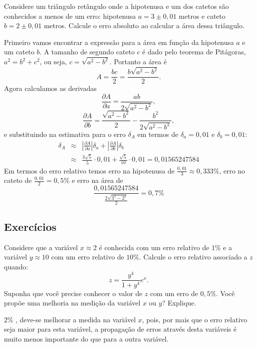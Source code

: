 \begin{ex}
Considere um triângulo retângulo onde a hipotenusa e um dos catetos são conhecidos a menos de um erro: hipotenusa $a=3\pm 0,01$ metros e cateto $b=2\pm 0,01$ metros. Calcule o erro absoluto ao calcular a área dessa triângulo.
\end{ex}
\begin{sol}
Primeiro vamos encontrar a expressão para a área em função da hipotenusa $a$ e um cateto $b$. A tamanho de segundo cateto $c$ é dado pelo teorema de Pitágoras, $a^2=b^2+c^2$, ou seja, $c=\sqrt{a^2-b^2}$. Portanto a área é $$
A=\frac{bc}{2}=\frac{b\sqrt{a^2-b^2}}{2}.
$$
Agora calculamos as derivadas
$$
\frac{\partial A}{\partial a}=\frac{ab}{2\sqrt{a^2-b^2}},
$$
$$
\frac{\partial A}{\partial b}=\frac{\sqrt{a^2-b^2}}{2}-\frac{b^2}{2\sqrt{a^2-b^2}},
$$
e substituindo na estimativa para o erro $\delta_A$ em termos de $\delta_a=0,01$ e $\delta_b=0,01$:
\begin{eqnarray*}
\delta_A&\approx & \left|\frac{\partial A}{\partial a}\right|\delta_a+\left|\frac{\partial A}{\partial b}\right|\delta_b\\
&\approx &\frac{3\sqrt{5}}{5}\cdot 0,01+\frac{\sqrt{5}}{10}\cdot 0,01=0,01565247584
\end{eqnarray*}
Em termos do erro relativo temos erro na hipotenusa de $\frac{0,01}{3}\approx 0,333\%$, erro no cateto de $\frac{0,01}{2}= 0,5\%$ e erro na área de
$$
\frac{0,01565247584}{\frac{2\sqrt{3^2-2^2}}{2}}=0,7\%
$$
\end{sol}

\subsection*{Exercícios}

\begin{exer}Considere que a variável $x\approx 2$ é conhecida com um erro relativo de $1\%$ e a variável $y\approx 10$ com um erro relativo de $10\%$. Calcule o erro relativo associado a $z$ quando:
  \begin{equation*}
    z=\frac{y^4}{1+y^4}e^x.  
  \end{equation*}
Suponha que você precise conhecer o valor de $z$ com um erro de $0,5\%$. Você propõe uma melhoria na medição da variável $x$ ou $y$? Explique.
\end{exer}
\begin{resp}
  
    $2\%$  , deve-se melhorar a medida na variável $x$, pois, por mais que o erro relativo seja maior para esta variável, a propagação de erros através desta variáveis é muito menos importante do que para a outra variável.  
  
\end{resp}

